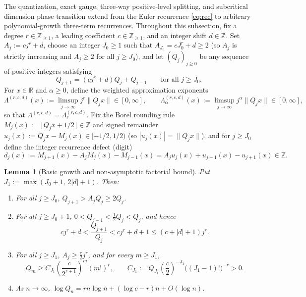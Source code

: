 \documentclass[11pt]{article}
\newtheorem{lemma}[theorem]{Lemma}
\theoremstyle{definition}
\theoremstyle{remark}
\newcommand{\R}{\mathbb{R}}
\newcommand{\Z}{\mathbb{Z}}
\newcommand{\Lam}{\Lambda}
\begin{document}
The quantization, exact gauge, three-way positive-level splitting, and
subcritical dimension phase transition extend from the Euler recurrence
\eqref{eq:rec} to arbitrary polynomial-growth three-term recurrences. Throughout
this subsection, fix a degree $r\in\Z_{\ge1}$, a leading coefficient
$c\in\Z_{\ge1}$, and an integer shift $d\in\Z$. Set $A_j:=cj^r+d$, choose an
integer $J_0\ge1$ such that $A_{J_0}=cJ_0^r+d\ge2$ (so $A_j$ is strictly
increasing and $A_j\ge2$ for all $j\ge J_0$), and let $(Q_j)_{j\ge0}$ be any
sequence of positive integers satisfying
\begin{equation}\label{eq:poly-rec}
Q_{j+1}=(cj^r+d)Q_j+Q_{j-1}\qquad\text{for all }j\ge J_0.
\end{equation}
For $x\in\R$ and $\alpha\ge0$, define the weighted approximation exponents
\[
\Lam^{(r,c,d)}(x):=\limsup_{j\to\infty}j^r\|Q_jx\|\in[0,\infty],\qquad
\Lam_\alpha^{(r,c,d)}(x):=\limsup_{j\to\infty}j^\alpha\|Q_jx\|\in[0,\infty],
\]
so that $\Lam^{(r,c,d)}=\Lam_r^{(r,c,d)}$. Fix the Borel rounding rule
$M_j(x):=\lfloor Q_jx+1/2\rfloor\in\Z$ and signed remainder
$u_j(x):=Q_jx-M_j(x)\in[-1/2,1/2)$ (so $|u_j(x)|=\|Q_jx\|$), and for $j\ge J_0$
define the integer recurrence defect (digit)
\begin{equation}\label{eq:poly-defect-id}
d_j(x):=M_{j+1}(x)-A_jM_j(x)-M_{j-1}(x)=A_ju_j(x)+u_{j-1}(x)-u_{j+1}(x)\in\Z.
\end{equation}

\begin{lemma}[Basic growth and non-asymptotic factorial bound]\label{lem:poly-growth}
Put $J_1:=\max(J_0+1,\,2|d|+1)$. Then:
\begin{enumerate}[label=(\roman*),leftmargin=2em]
\item For all $j\ge J_0$, $Q_{j+1}>A_jQ_j\ge2Q_j$.
\item For all $j\ge J_0+1$, $0<Q_{j-1}<\frac12Q_j<Q_j$, and hence
\[
cj^r+d<\frac{Q_{j+1}}{Q_j}<cj^r+d+1\le(c+|d|+1)j^r.
\]
\item For all $j\ge J_1$, $A_j\ge\frac{c}{2}j^r$, and for every $m\ge J_1$,
\[
Q_m\ge C_{J_1}\left(\frac{c}{2^{r+1}}\right)^m(m!)^r,\qquad
C_{J_1}:=Q_{J_1}\left(\frac{c}{2}\right)^{-J_1}\bigl((J_1-1)!\bigr)^{-r}>0.
\]
\item As $n\to\infty$, $\log Q_n=rn\log n+(\log c-r)n+O(\log n)$.
\end{enumerate}
\end{lemma}
\end{document}
